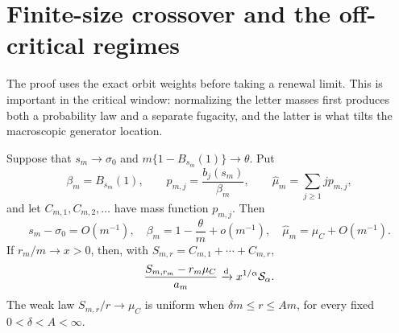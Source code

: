 \section{Finite-size crossover and the off-critical regimes}
\label{sec:finite-size-crossover}

The proof uses the exact orbit weights before taking a renewal limit.  This
is important in the critical window: normalizing the letter masses first
produces both a probability law and a separate fugacity, and the latter is
what tilts the macroscopic generator location.

\begin{lemma}
\label{lem:near-critical-letter-array}
Suppose that \(s_m\to\sigma_0\) and
\(m\{1-B_{s_m}(1)\}\to\theta\).  Put
\[
 \beta_m=B_{s_m}(1),\qquad
 p_{m,j}=\frac{b_j(s_m)}{\beta_m},\qquad
 \widehat\mu_m=\sum_{j\ge1}jp_{m,j},
\]
and let \(C_{m,1},C_{m,2},\ldots\) have mass function \(p_{m,j}\).
Then
\begin{equation}
 s_m-\sigma_0=O(m^{-1}),\quad
 \beta_m=1-\frac{\theta}{m}+o(m^{-1}),\quad
 \widehat\mu_m=\mu_C+O(m^{-1}).
 \label{eq:near-critical-basic-expansions}
\end{equation}
If \(r_m/m\to x>0\), then, with
\(S_{m,r}=C_{m,1}+\cdots+C_{m,r}\),
\begin{equation}
 \frac{S_{m,r_m}-r_m\mu_C}{a_m}
 \xrightarrow{\rm d}x^{1/\alpha}\mathcal S_\alpha.
 \label{eq:near-critical-triangular-stable-limit}
\end{equation}
The weak law \(S_{m,r}/r\to\mu_C\) is uniform when
\(\delta m\le r\le A m\), for every fixed \(0<\delta<A<\infty\).
\end{lemma}

